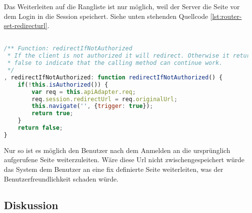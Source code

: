 Das Weiterleiten auf die Rangliste ist nur möglich, weil der Server die Seite vor dem Login in die Session speichert. Siehe unten stehenden Quellcode \ref{lst:router-set-redirecturl}.

\begin{lstlisting}[language=JavaScript, caption=Router - Autorisationskontrolle \cite{roomiesRouter}, label=lst:router-set-redirecturl, firstnumber=225]

/** Function: redirectIfNotAuthorized
 * If the client is not authorized it will redirect. Otherwise it returns
 * false to indicate that the calling method can continue work.
 */
, redirectIfNotAuthorized: function redirectIfNotAuthorized() {
	if(!this.isAuthorized()) {
		var req = this.apiAdapter.req;
		req.session.redirectUrl = req.originalUrl;
		this.navigate('', {trigger: true});
		return true;
	}
	return false;
}
\end{lstlisting}

Nur so ist es möglich den Benutzer nach dem Anmelden an die ursprünglich aufgerufene Seite weiterzuleiten. Wäre diese Url nicht zwischengespeichert würde das System dem Benutzer an eine fix definierte Seite weiterleiten, was der Benutzerfreundlichkeit schaden würde.

\subsection*{Diskussion}
